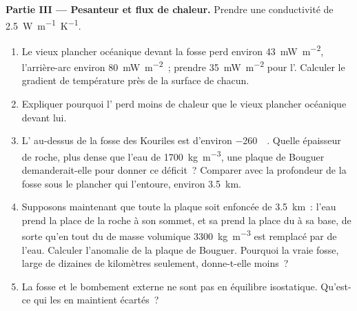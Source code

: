 \begin{problem}
\medskip
\noindent\textbf{Partie III --- Pesanteur et flux de chaleur.} Prendre une conductivité de
\qty{2.5}{W.m^{-1}.K^{-1}}.
\begin{enumerate}[resume]
  \item Le vieux plancher océanique devant la fosse perd environ
        \qty{43}{mW.m^{-2}}, l'arrière-arc environ \qty{80}{mW.m^{-2}}~; prendre
        \qty{35}{mW.m^{-2}} pour l'. Calculer le gradient de température
        près de la surface de chacun.
  \item Expliquer pourquoi l' perd moins de chaleur que le vieux plancher océanique
        devant lui.
  \item L' au-dessus de la fosse des Kouriles est d'environ
        \qty{-260}{\milli\gal}. Quelle épaisseur de roche, plus dense que l'eau de \qty{1700}{kg.m^{-3}},
        une plaque de Bouguer demanderait-elle pour donner ce déficit~?
        Comparer avec la profondeur de la fosse sous le plancher qui l'entoure,
        environ \qty{3.5}{km}.
  \item Supposons maintenant que toute la plaque soit enfoncée de \qty{3.5}{km}~:
        l'eau prend la place de la roche à son sommet, et sa  prend la
        place du  à sa base, de sorte qu'en tout du  de masse volumique
        \qty{3300}{kg.m^{-3}} est remplacé par de l'eau. Calculer l'anomalie de la
        plaque de Bouguer. Pourquoi la vraie fosse, large de dizaines de kilomètres seulement, donne-t-elle
        moins~?
  \item La fosse et le bombement externe ne sont pas en équilibre isostatique. Qu'est-ce qui
        les en maintient écartés~?
\end{enumerate}


\end{problem}
